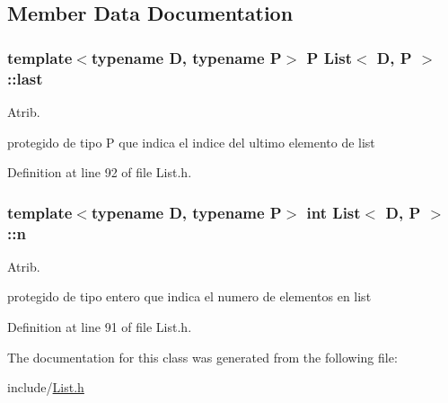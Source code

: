 \subsection{Member Data Documentation}
\hypertarget{class_list_a32b9741aa48daca064edf0e83abf7a0f}{
\subsubsection[{last}]{\setlength{\rightskip}{0pt plus 5cm}template$<$typename D, typename P$>$ P {\bf List}$<$ {\bf D}, P $>$\+::last\hspace{0.3cm}{\ttfamily [protected]}}}\label{class_list_a32b9741aa48daca064edf0e83abf7a0f}


Atrib. 

protegido de tipo P que indica el indice del ultimo elemento de list 

Definition at line 92 of file List.\+h.

\hypertarget{class_list_aa61221b9bda8b2b56a61bd869daacbfd}{
\subsubsection[{n}]{\setlength{\rightskip}{0pt plus 5cm}template$<$typename D, typename P$>$ int {\bf List}$<$ {\bf D}, P $>$\+::n\hspace{0.3cm}{\ttfamily [protected]}}}\label{class_list_aa61221b9bda8b2b56a61bd869daacbfd}


Atrib. 

protegido de tipo entero que indica el numero de elementos en list 

Definition at line 91 of file List.\+h.



The documentation for this class was generated from the following file\+:\begin{DoxyCompactItemize}
\item 
include/\hyperlink{_list_8h}{List.\+h}\end{DoxyCompactItemize}
